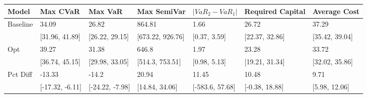 \begin{tabular}{lllllll}
\toprule
   Model &        Max CVaR &         Max VaR &      Max SemiVar & $|VaR_2 - VaR_1|$ & Required Capital &   Average Cost \\
\midrule
Baseline &           34.09 &           26.82 &           864.81 &              1.66 &            26.72 &          37.29 \\
         &  [31.96, 41.89] &  [26.22, 29.15] & [673.22, 926.76] &      [0.37, 3.59] &   [22.37, 32.86] & [35.42, 39.04] \\
     Opt &           39.27 &           31.38 &            646.8 &              1.97 &            23.28 &          33.72 \\
         &  [36.74, 45.15] &  [29.98, 33.05] &  [514.3, 753.51] &      [0.98, 5.13] &   [19.21, 31.34] & [32.02, 35.86] \\
Pct Diff &          -13.33 &           -14.2 &            20.94 &             11.45 &            10.48 &           9.71 \\
         & [-17.32, -6.11] & [-24.22, -7.98] &   [14.84, 34.06] &   [-583.6, 57.68] &   [-0.38, 18.88] &  [5.98, 12.06] \\
\bottomrule
\end{tabular}
